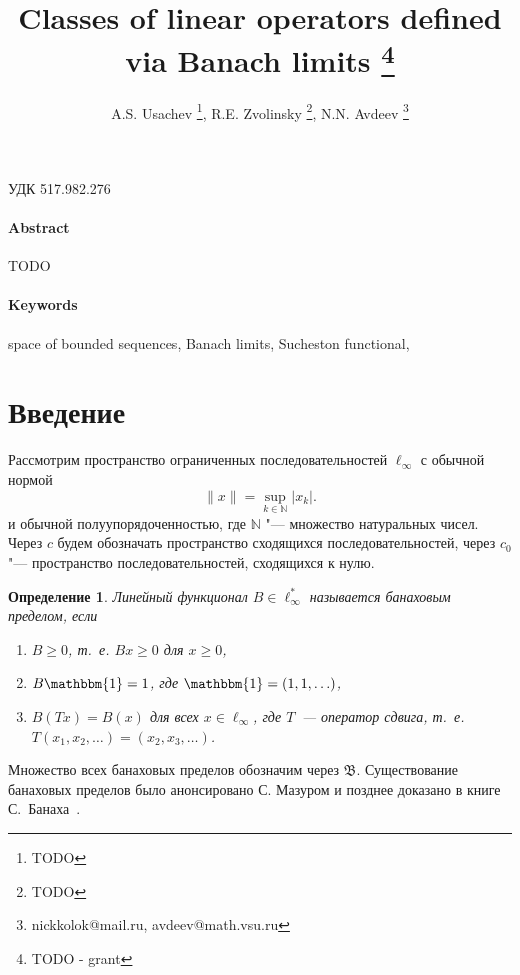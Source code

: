 \documentclass[a4paper,14pt]{article} %
\theoremstyle{plain}
\newtheorem{definition}[lemma]{Определение}
\begin{document}

\title{
	Classes of linear operators defined via Banach limits
	\footnote{
		TODO - grant
	}
}

\author{
	A.S. Usachev
	\footnote{TODO},
	R.E. Zvolinsky
	\footnote{TODO},
	N.N. Avdeev
	\footnote{nickkolok@mail.ru, avdeev@math.vsu.ru}
}

\maketitle

УДК 517.982.276 %

\paragraph{Abstract}
TODO


\paragraph{Keywords}
	space of bounded sequences,
	Banach limits,
	Sucheston functional,




\section{Введение}

Рассмотрим пространство ограниченных последовательностей $\ell_\infty$ с обычной нормой
\begin{equation*}
	\|x\| = \sup_{k\in\mathbb{N}} |x_k|
	.
\end{equation*}
и обычной полуупорядоченностью, где $\mathbb{N}$ "--- множество натуральных чисел.
Через $c$ будем обозначать пространство сходящихся последовательностей,
через $c_0$ "--- пространство последовательностей, сходящихся к нулю.


\begin{definition}
	Линейный функционал $B\in \ell_\infty^*$ называется банаховым пределом,
	если
	\begin{enumerate}
		\item
			$B\geq0$, т.~е. $Bx \geq 0$ для $x \geq 0$,
		\item
			$B\mathbbm{1}=1$, где $\mathbbm{1} =(1,1,\ldots)$,
		\item
			$B(Tx)=B(x)$ для всех $x\in \ell_\infty$, где $T$~---
		оператор сдвига, т.~е. $T(x_1,x_2,\ldots)=(x_2,x_3,\ldots)$.
	\end{enumerate}
\end{definition}
Множество всех банаховых пределов обозначим через $\mathfrak{B}$.
Существование банаховых пределов было анонсировано С. Мазуром \cite{Mazur} и позднее доказано в книге С.~Банаха~\cite{B}.
\end{document}
